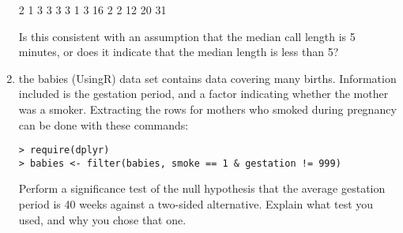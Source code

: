 \documentclass[11pt]{article}
\begin{document}
\begin{enumerate}
2 1 3 3 3 3 1 3 16 2 2 12 20 31 

Is this consistent with an assumption that the median call length is 5 minutes, or does it indicate that the median length is less than 5? 
\item the babies (UsingR) data set contains data covering many births. Information included is the gestation period, and a factor indicating whether the mother was a smoker. Extracting the rows for mothers who smoked during pregnancy can be done with these commands: 
\begin{verbatim}
> require(dplyr)
> babies <- filter(babies, smoke == 1 & gestation != 999)
\end{verbatim}
Perform a significance test of the null hypothesis that the average gestation period is 40 weeks against a two-sided alternative. Explain what test you used, and why you chose that one. 
  \end{enumerate}
\end{document}

